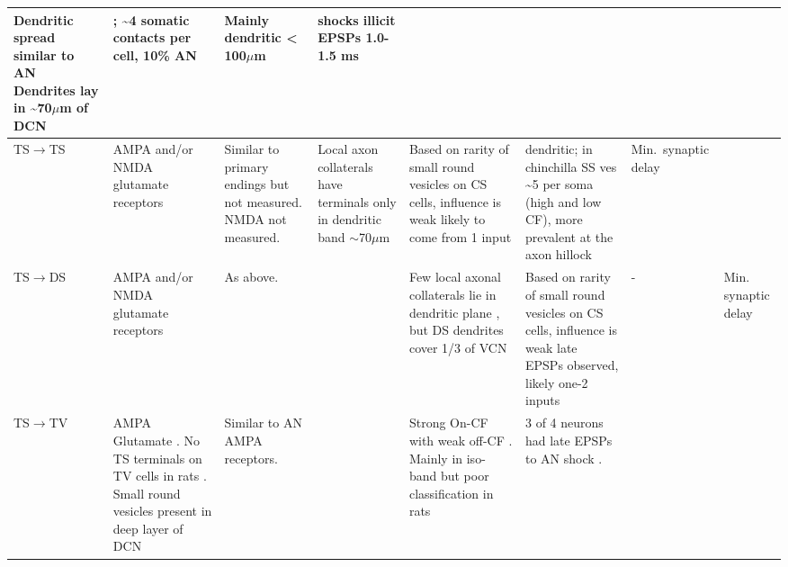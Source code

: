 \begin{longtable}{XXXXXXXX}
Dendritic spread similar to AN  \citep{SpirouDavisEtAl:1999} 
Dendrites lay in \~{}70$\mu$m of DCN \citep[mouse][]{ZhangOertel:1993}                          
& %
 \citep{SpirouDavisEtAl:1999,ZhangOertel:1993} ;
     \~{}4 somatic contacts per cell, 10\% AN \citep{Alibardi:1999}       
& %
Mainly dendritic {\textless} 100$\mu$m \citep{Alibardi:1999,Liberman:1993,RubioJuiz:2004,SpirouDavisEtAl:1999}  
& %
shocks illicit EPSPs 1.0-1.5 ms \citep{ZhangOertel:1993}
\\ \midrule
TS\ensuremath{\rightarrow}TS                        
& %
AMPA and/or NMDA glutamate receptors \citep{FerragamoGoldingEtAl:1998a}        
& %
Similar to primary endings but not measured.  
NMDA not measured.           
& %
Local axon collaterals have terminals only in dendritic band $\sim$70$\mu$m \citep[cat][]{SmithRhode:1989} 
& %
Based on rarity of small round vesicles on CS cells, influence is weak \citep{SmithRhode:1989} 
likely to come from 1 input \citep{FerragamoGoldingEtAl:1998a}                     
& %
dendritic; \citep{JosephsonMorest:1998}
in chinchilla SS ves \~{}5 per soma (high and low CF), more prevalent at the
                              axon hillock                                
& %
Min.\ synaptic delay 
\\ \midrule
TS\ensuremath{\rightarrow}DS                        
& %
AMPA and/or NMDA glutamate receptors \citep{FerragamoGoldingEtAl:1998a}  
& As above.                                   
& %
& %
Few local axonal collaterals lie in dendritic plane \citep{SmithRhode:1989}, but DS dendrites cover 1/3 of VCN
& 
Based on rarity of small round vesicles on CS cells, influence is weak \citep{SmithRhode:1989} late EPSPs observed,
likely one-2 inputs \citep{FerragamoGoldingEtAl:1998a, OertelWuEtAl:1990} 
& -                                     
& Min. synaptic delay \\ \midrule
TS\ensuremath{\rightarrow}TV                        
& %
AMPA Glutamate \citep{DoucetRossEtAl:1999,FerragamoGoldingEtAl:1998a,ZhangOertel:1993}.
No TS terminals on TV cells in rats \citep[rat][]{RubioJuiz:2004}.
Small round vesicles present in deep layer of DCN \citep[guinea pig][]{Alibardi:1999}
& 
Similar to AN AMPA receptors.        
& %
& %

Strong On-CF with weak off-CF  \citep[See fig 13][]{OstapoffBensonEtAl:1999}. 
Mainly in iso-band but poor classification in rats \citep{DoucetRossEtAl:1999,FriedlandPongstapornEtAl:2003}         
& %
3 of 4 neurons had late EPSPs to AN shock \citep[very young mice][]{ZhangOertel:1993}.
\citep{OstapoffBensonEtAl:1999} 


\end{longtable}
